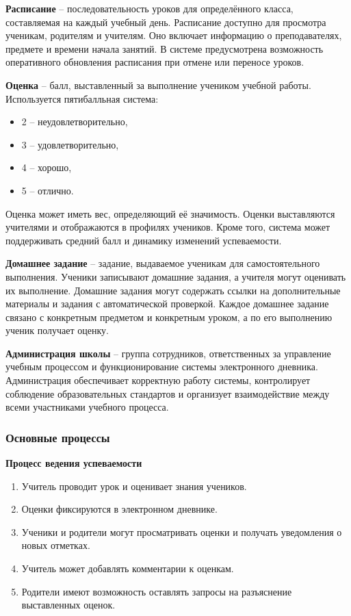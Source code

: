 \documentclass[a4paper, final]{article}
\begin{document}
\textbf{Расписание} -- последовательность уроков для определённого класса, составляемая на каждый учебный день. Расписание доступно для просмотра ученикам, родителям и учителям. Оно включает информацию о преподавателях, предмете и времени начала занятий. В системе предусмотрена возможность оперативного обновления расписания при отмене или переносе уроков.

\textbf{Оценка} -- балл, выставленный за выполнение учеником учебной работы. Используется пятибалльная система:
\begin{itemize}
\item 2 -- неудовлетворительно,
\item 3 -- удовлетворительно,
\item 4 -- хорошо,
\item 5 -- отлично.
\end{itemize}
Оценка может иметь вес, определяющий её значимость. Оценки выставляются учителями и отображаются в профилях учеников. Кроме того, система может поддерживать средний балл и динамику изменений успеваемости.

\textbf{Домашнее задание} -- задание, выдаваемое ученикам для самостоятельного выполнения. Ученики записывают домашние задания, а учителя могут оценивать их выполнение. Домашние задания могут содержать ссылки на дополнительные материалы и задания с автоматической проверкой. Каждое домашнее задание связано с конкретным предметом и конкретным уроком, а по его выполнению ученик получает оценку.

\textbf{Администрация школы} -- группа сотрудников, ответственных за управление учебным процессом и функционирование системы электронного дневника. Администрация обеспечивает корректную работу системы, контролирует соблюдение образовательных стандартов и организует взаимодействие между всеми участниками учебного процесса.

\subsubsection{Основные процессы}
\noindent \textbf{Процесс ведения успеваемости}
\begin{enumerate}
  \item Учитель проводит урок и оценивает знания учеников.
  \item Оценки фиксируются в электронном дневнике.
  \item Ученики и родители могут просматривать оценки и получать уведомления о новых отметках.
  \item Учитель может добавлять комментарии к оценкам.
  \item Родители имеют возможность оставлять запросы на разъяснение выставленных оценок.
\end{enumerate}
\end{document}
